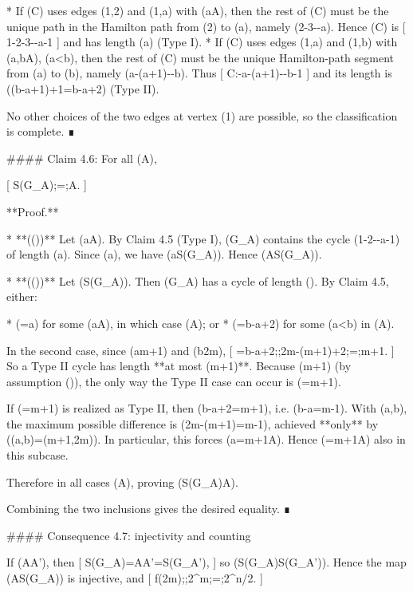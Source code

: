 * If (C) uses edges ({1,2}) and ({1,a}) with (a\in A), then the rest of (C) must be the unique path in the Hamilton path from (2) to (a), namely (2-3-\cdots-a). Hence (C) is
  [
  1-2-3-\cdots-a-1
  ]
  and has length (a) (Type I).
* If (C) uses edges ({1,a}) and ({1,b}) with (a,b\in A), (a<b), then the rest of (C) must be the unique Hamilton-path segment from (a) to (b), namely (a-(a+1)-\cdots-b). Thus
  [
  C:-a-(a+1)-\cdots-b-1
  ]
  and its length is ((b-a+1)+1=b-a+2) (Type II).

No other choices of the two edges at vertex (1) are possible, so the classification is complete. ∎

#### Claim 4.6: For all (A),

[
S(G_A);=;A.
]

**Proof.**

* **((\supseteq))** Let (a\in A). By Claim 4.5 (Type I), (G_A) contains the cycle (1-2-\cdots-a-1) of length (a). Since (a), we have (a\in S(G_A)). Hence (A\subseteq S(G_A)).

* **((\subseteq))** Let (\ell\in S(G_A)). Then (G_A) has a cycle of length (\ell). By Claim 4.5, either:

  * (\ell=a) for some (a\in A), in which case (\ell\in A); or
  * (\ell=b-a+2) for some (a<b) in (A).

  In the second case, since (a\ge m+1) and (b\le 2m),
  [
  \ell=b-a+2;\le;2m-(m+1)+2;=;m+1.
  ]
  So a Type II cycle has length **at most (m+1)**. Because (\ell\ge m+1) (by assumption (\ell{})), the only way the Type II case can occur is (\ell=m+1).

  If (\ell=m+1) is realized as Type II, then (b-a+2=m+1), i.e. (b-a=m-1). With (a,b), the maximum possible difference is (2m-(m+1)=m-1), achieved **only** by ((a,b)=(m+1,2m)). In particular, this forces (a=m+1\in A). Hence (\ell=m+1\in A) also in this subcase.

  Therefore in all cases (\ell\in A), proving (S(G_A)\subseteq A).

Combining the two inclusions gives the desired equality. ∎

#### Consequence 4.7: injectivity and counting

If (A\neq A'), then
[
S(G_A)=A\neq A'=S(G_{A'}),
]
so (S(G_A)\neq S(G_{A'})). Hence the map (A\mapsto S(G_A)) is injective, and
[
f(2m);\ge;2^{m};=;2^{n/2}.
]

